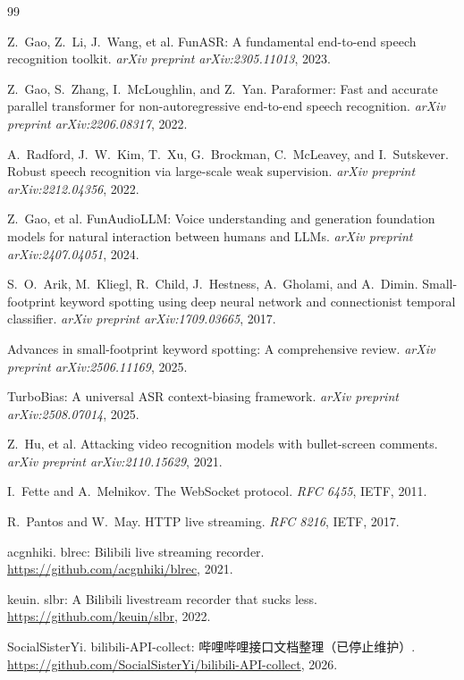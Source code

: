\documentclass[UTF8,11pt,a4paper]{ctexart}
\begin{document}
\begin{thebibliography}{99}

Z.~Gao, Z.~Li, J.~Wang, et al.
\newblock FunASR: A fundamental end-to-end speech recognition toolkit.
\newblock \emph{arXiv preprint arXiv:2305.11013}, 2023.

Z.~Gao, S.~Zhang, I.~McLoughlin, and Z.~Yan.
\newblock Paraformer: Fast and accurate parallel transformer for non-autoregressive end-to-end speech recognition.
\newblock \emph{arXiv preprint arXiv:2206.08317}, 2022.

A.~Radford, J.~W.~Kim, T.~Xu, G.~Brockman, C.~McLeavey, and I.~Sutskever.
\newblock Robust speech recognition via large-scale weak supervision.
\newblock \emph{arXiv preprint arXiv:2212.04356}, 2022.

Z.~Gao, et al.
\newblock FunAudioLLM: Voice understanding and generation foundation models for natural interaction between humans and LLMs.
\newblock \emph{arXiv preprint arXiv:2407.04051}, 2024.

S.~O.~Arik, M.~Kliegl, R.~Child, J.~Hestness, A.~Gholami, and A.~Dimin.
\newblock Small-footprint keyword spotting using deep neural network and connectionist temporal classifier.
\newblock \emph{arXiv preprint arXiv:1709.03665}, 2017.

Advances in small-footprint keyword spotting: A comprehensive review.
\newblock \emph{arXiv preprint arXiv:2506.11169}, 2025.

TurboBias: A universal ASR context-biasing framework.
\newblock \emph{arXiv preprint arXiv:2508.07014}, 2025.

Z.~Hu, et al.
\newblock Attacking video recognition models with bullet-screen comments.
\newblock \emph{arXiv preprint arXiv:2110.15629}, 2021.

I.~Fette and A.~Melnikov.
\newblock The WebSocket protocol.
\newblock \emph{RFC 6455}, IETF, 2011.

R.~Pantos and W.~May.
\newblock HTTP live streaming.
\newblock \emph{RFC 8216}, IETF, 2017.

acgnhiki.
\newblock blrec: Bilibili live streaming recorder.
\newblock \url{https://github.com/acgnhiki/blrec}, 2021.

keuin.
\newblock slbr: A Bilibili livestream recorder that sucks less.
\newblock \url{https://github.com/keuin/slbr}, 2022.

SocialSisterYi.
\newblock bilibili-API-collect: 哔哩哔哩接口文档整理（已停止维护）.
\newblock \url{https://github.com/SocialSisterYi/bilibili-API-collect}, 2026.

\end{thebibliography}
\end{document}
